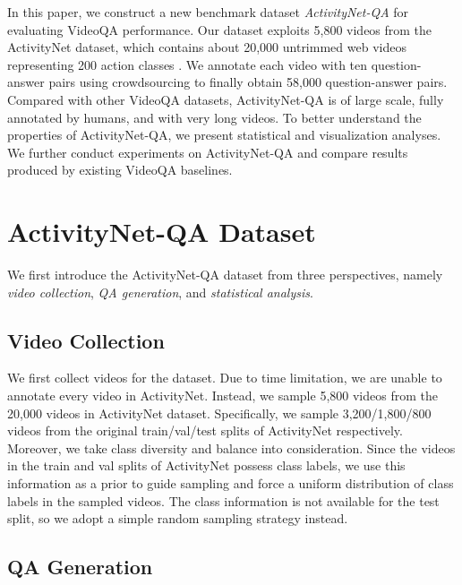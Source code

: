 \documentclass[letterpaper]{article} \usepackage{aaai19}  \usepackage{times}  \usepackage{helvet}  \usepackage{courier}  \usepackage{url}  \usepackage{graphicx}  \usepackage{amsfonts}
\begin{document}
In this paper, we construct a new benchmark dataset \emph{ActivityNet-QA} for evaluating VideoQA performance. Our dataset exploits 5,800 videos from the ActivityNet dataset, which contains about 20,000 untrimmed web videos representing 200 action classes \cite{caba2015activitynet}. We annotate each video with ten question-answer pairs using crowdsourcing to finally obtain 58,000 question-answer pairs. Compared with other VideoQA datasets, ActivityNet-QA is of large scale, fully annotated by humans, and with very long videos. To better understand the properties of ActivityNet-QA, we present statistical and visualization analyses. We further conduct experiments on ActivityNet-QA and compare results produced by existing VideoQA baselines.

\section{ActivityNet-QA Dataset}
We first introduce the ActivityNet-QA dataset from three perspectives, namely \emph{video collection}, \emph{QA generation}, and \emph{statistical analysis}.

\subsection{Video Collection}
We first collect videos for the dataset. Due to time limitation, we are unable to annotate every video in ActivityNet. Instead, we sample 5,800 videos from the 20,000 videos in ActivityNet dataset. Specifically, we sample 3,200/1,800/800 videos from the original {train}/{val}/{test} splits of ActivityNet respectively. Moreover, we take class diversity and balance into consideration. Since the videos in the {train} and {val} splits of ActivityNet possess class labels, we use this information as a prior to guide sampling and force a uniform distribution of class labels in the sampled videos. The class information is not available for the test split, so we adopt a simple random sampling strategy instead.

\subsection{QA Generation}
\end{document}
